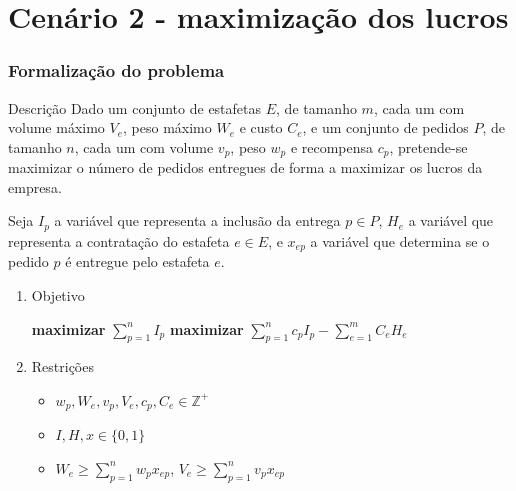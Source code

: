 \documentclass{beamer}
\begin{document}







\section{Cenário 2 - maximização dos lucros}

\begin{frame}
\frametitle{Formalização do problema}
\begin{block}{Descrição}
Dado um conjunto de estafetas $E$, de tamanho $m$, cada um com volume máximo $V_{e}$, peso máximo $W_{e}$ e custo $C_{e}$,
e um conjunto de pedidos $P$, de tamanho $n$, cada um com volume $v_{p}$, peso $w_{p}$ e recompensa $c_{p}$, pretende-se
maximizar o número de pedidos entregues de forma a maximizar os lucros da empresa.  
\end{block}

Seja $I_{p}$ a variável que representa a inclusão da entrega $p \in P$, $H_{e}$ a variável que representa
a contratação do estafeta $e \in E$, e $x_{ep}$ a variável que determina se o pedido $p$ é entregue pelo estafeta $e$.

\begin{enumerate}
\setlength\itemsep{1em}
\item{Objetivo}

\textbf{maximizar} $ \sum_{p = 1}^{n} I_{p} $ 
\hspace{1cm} \textbf{maximizar} $ \sum_{p = 1}^{n} c_{p}I_{p} - \sum_{e = 1}^{m} C_{e}H_{e} $

\item{Restrições}
\begin{itemize}
  \item $ w_{p}, W_{e}, v_{p}, V_{e}, c_{p}, C_{e} \in \mathbb{Z}^{+} $  
  \item $ I, H, x \in \{ 0, 1 \} $
  \item $ W_{e} \geq \sum_{p = 1}^{n} w_{p}x_{ep} $, $ V_{e} \geq \sum_{p = 1}^{n} v_{p}x_{ep} $
\end{itemize}

\end{enumerate}

\end{frame}
\end{document}
